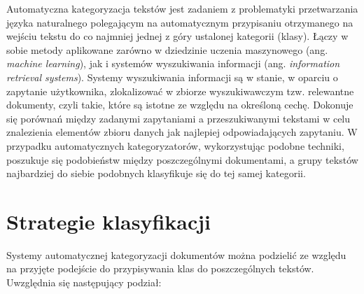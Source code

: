 \documentclass{pracamgr}
\begin{document}
Automatyczna kategoryzacja tekstów jest zadaniem z problematyki przetwarzania języka naturalnego polegającym na automatycznym przypisaniu otrzymanego na wejściu tekstu do co najmniej jednej z góry ustalonej kategorii (klasy). Łączy w sobie metody aplikowane zarówno w dziedzinie uczenia maszynowego (ang. \textit{machine learning}), jak i systemów wyszukiwania informacji (ang. \textit{information retrieval systems}). Systemy wyszukiwania informacji są w stanie, w oparciu o zapytanie użytkownika, zlokalizować w zbiorze wyszukiwawczym tzw. relewantne dokumenty, czyli takie, które są istotne ze względu na określoną cechę. Dokonuje się porównań między zadanymi zapytaniami a przeszukiwanymi tekstami w celu znalezienia elementów zbioru danych jak najlepiej odpowiadających zapytaniu. W przypadku automatycznych kategoryzatorów, wykorzystując podobne techniki, poszukuje się podobieństw między poszczególnymi dokumentami, a grupy tekstów najbardziej do siebie podobnych klasyfikuje się do tej samej kategorii.


\section{Strategie klasyfikacji}
Systemy automatycznej kategoryzacji dokumentów można podzielić ze względu na przyjęte podejście do przypisywania klas do poszczególnych tekstów. Uwzględnia się następujący podział:
\end{document}
